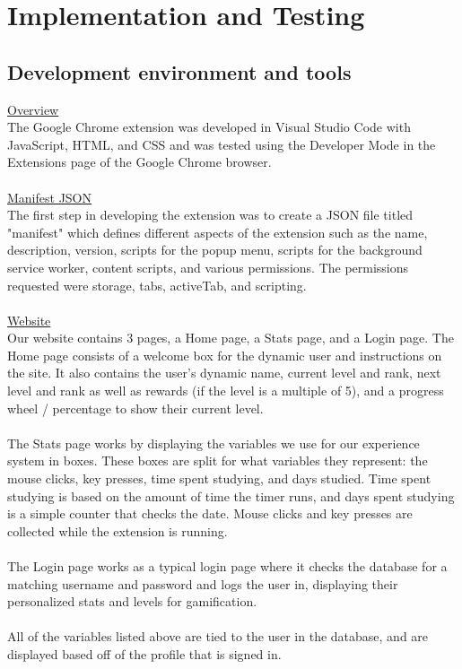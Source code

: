 \documentclass[12pt]{article}
\begin{document}
\section{Implementation and Testing}
\subsection{Development environment and tools}
\noindent \underline{Overview} \\
The Google Chrome extension was developed in Visual Studio Code with JavaScript, HTML, and CSS
and was tested using the Developer Mode in the Extensions page of the Google Chrome browser. 
\\\\
\underline{Manifest JSON}\\
The first step in developing the extension was to create a JSON file titled "manifest" which  
defines different aspects of the extension such as the name, description, version, scripts for the popup menu, 
scripts for the background service worker, content scripts, and various permissions. The permissions requested were storage, tabs, activeTab, and scripting.
\\\\

\noindent \underline{Website} \\
Our website contains 3 pages, a Home page, a Stats page, and a Login page. The Home page consists of a welcome box for the dynamic user and instructions on the site. It also contains the user’s dynamic name, current level and rank, next level and rank as well as rewards (if the level is a multiple of 5), and a progress wheel / percentage to show their current level.
\\\\The Stats page works by displaying the variables we use for our experience system in boxes. These boxes are split for what variables they represent: the mouse clicks, key presses, time spent studying, and days studied. Time spent studying is based on the amount of time the timer runs, and days spent studying is a simple counter that checks the date. Mouse clicks and key presses are collected while the extension is running. 
\\\\The Login page works as a typical login page where it checks the database for a matching username and password and logs the user in, displaying their personalized stats and levels for gamification.
\\\\All of the variables listed above are tied to the user in the database, and are displayed based off of the profile that is signed in.
\\\\
\end{document}
